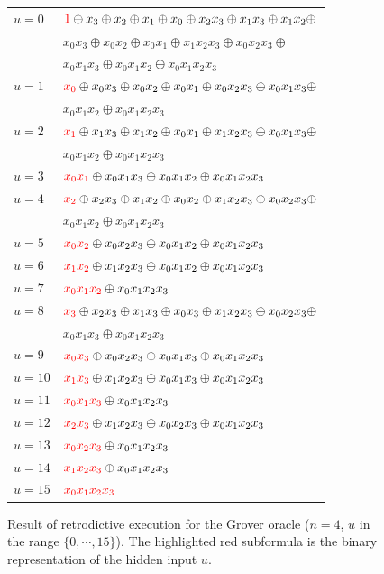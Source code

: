 \documentclass[aps,prl,twocolumn,superscriptaddress,floatfix,notitlepage]{revtex4-2}
\newcommand{\red}[1]{{\color{red}{#1}}}
\begin{document}
\begin{figure}[!]
\begin{tabular}{ll}
$u=0$ & 
  $\red{1} \oplus x_3 \oplus x_2 \oplus x_1 \oplus x_0 \oplus x_2x_3 \oplus x_1x_3 \oplus x_1x_2 \oplus$ \\
  &\quad $x_0x_3 \oplus x_0x_2 \oplus x_0x_1 \oplus x_1x_2x_3 \oplus x_0x_2x_3 \oplus$ \\
  &\quad $x_0x_1x_3 \oplus x_0x_1x_2 \oplus x_0x_1x_2x_3$ \\
$u=1$ & 
  $\red{x_0} \oplus x_0x_3 \oplus x_0x_2 \oplus x_0x_1 \oplus x_0x_2x_3 \oplus x_0x_1x_3 \oplus$ \\
  &\quad $x_0x_1x_2 \oplus x_0x_1x_2x_3$ \\
$u=2$ &
  $\red{x_1} \oplus x_1x_3 \oplus x_1x_2 \oplus x_0x_1 \oplus x_1x_2x_3 \oplus x_0x_1x_3 \oplus$ \\
  &\quad $x_0x_1x_2 \oplus x_0x_1x_2x_3$ \\
$u=3$ &
  $\red{x_0x_1} \oplus x_0x_1x_3 \oplus x_0x_1x_2 \oplus x_0x_1x_2x_3$ \\
$u=4$ &
  $\red{x_2} \oplus x_2x_3 \oplus x_1x_2 \oplus x_0x_2 \oplus x_1x_2x_3 \oplus x_0x_2x_3 \oplus$ \\
  &\quad $x_0x_1x_2 \oplus x_0x_1x_2x_3$ \\
$u=5$ &
  $\red{x_0x_2} \oplus x_0x_2x_3 \oplus x_0x_1x_2 \oplus x_0x_1x_2x_3$ \\
$u=6$ &
  $\red{x_1x_2} \oplus x_1x_2x_3 \oplus x_0x_1x_2 \oplus x_0x_1x_2x_3$ \\
$u=7$ &
  $\red{x_0x_1x_2} \oplus x_0x_1x_2x_3$ \\
$u=8$ &
  $\red{x_3} \oplus x_2x_3 \oplus x_1x_3 \oplus x_0x_3 \oplus x_1x_2x_3 \oplus x_0x_2x_3 \oplus$ \\
  &\quad $x_0x_1x_3 \oplus x_0x_1x_2x_3$ \\
$u=9$ &
  $\red{x_0x_3} \oplus x_0x_2x_3 \oplus x_0x_1x_3 \oplus x_0x_1x_2x_3$ \\
$u=10$ &
  $\red{x_1x_3} \oplus x_1x_2x_3 \oplus x_0x_1x_3 \oplus x_0x_1x_2x_3$ \\
$u=11$ &
  $\red{x_0x_1x_3} \oplus x_0x_1x_2x_3$ \\
$u=12$ &
  $\red{x_2x_3} \oplus x_1x_2x_3 \oplus x_0x_2x_3 \oplus x_0x_1x_2x_3$ \\
$u=13$ &
  $\red{x_0x_2x_3} \oplus x_0x_1x_2x_3$ \\
$u=14$ &
  $\red{x_1x_2x_3} \oplus x_0x_1x_2x_3$ \\
$u=15$ &
  $\red{x_0x_1x_2x_3}$
\end{tabular}
\caption{\label{fig:Grover}Result of retrodictive execution for the Grover oracle ($n=4$, $u$ in the range $\{0,\cdots,15\}$). The highlighted red subformula is the binary representation of the hidden input $u$.}
\end{figure}
\end{document}
